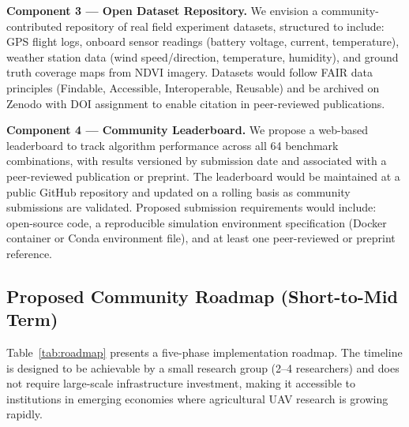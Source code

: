 \documentclass[review,3p,times]{elsarticle}
\begin{document}
\begin{itemize}
{\textbf{Component 3 --- Open Dataset Repository.} We envision a community-contributed repository of real field experiment datasets, structured to include: GPS flight logs, onboard sensor readings (battery voltage, current, temperature), weather station data (wind speed/direction, temperature, humidity), and ground truth coverage maps from NDVI imagery. Datasets would follow FAIR data principles (Findable, Accessible, Interoperable, Reusable) and be archived on Zenodo with DOI assignment to enable citation in peer-reviewed publications.

\textbf{Component 4 --- Community Leaderboard.} We propose a web-based leaderboard to track algorithm performance across all 64 benchmark combinations, with results versioned by submission date and associated with a peer-reviewed publication or preprint. The leaderboard would be maintained at a public GitHub repository and updated on a rolling basis as community submissions are validated. Proposed submission requirements would include: open-source code, a reproducible simulation environment specification (Docker container or Conda environment file), and at least one peer-reviewed or preprint reference.

\subsection{Proposed Community Roadmap (Short-to-Mid Term)}

Table~\ref{tab:roadmap} presents a five-phase implementation roadmap. The timeline is designed to be achievable by a small research group (2--4 researchers) and does not require large-scale infrastructure investment, making it accessible to institutions in emerging economies where agricultural UAV research is growing rapidly.

}
\end{itemize}
\end{document}
